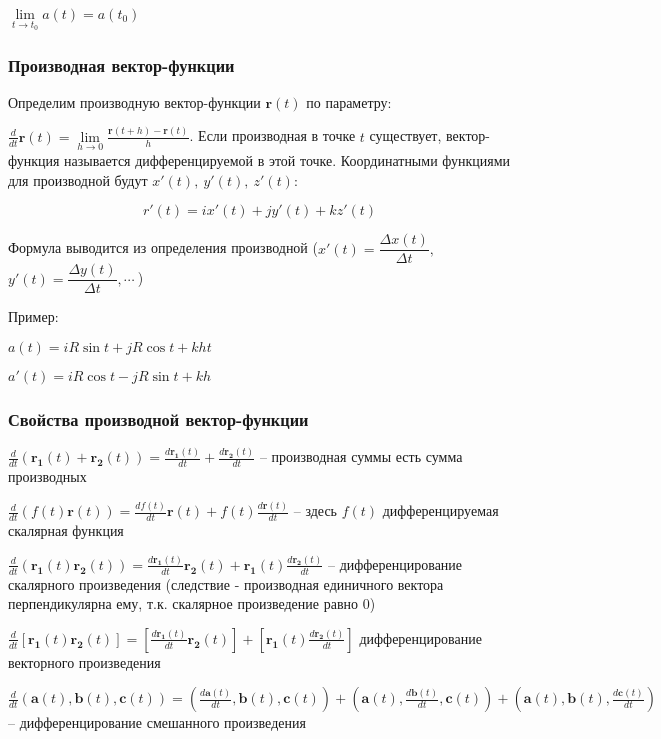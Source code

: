 $ \lim\limits_{t \to t_{0}}  a(t) = a(t_{0}) $

\subsubsection{Производная вектор-функции}

Определим производную вектор-функции $\mathbf{r}(t)$ по параметру:

$\frac{d}{dt}\mathbf{r}(t)=\lim\limits_{h\to 0}\frac{\mathbf{r}(t+h) - \mathbf{r}(t)}{h}$.
Если производная в точке $t$ существует, вектор-функция называется дифференцируемой в этой точке. Координатными функциями для производной будут $x'(t),\ y'(t),\ z'(t)$:

$$
r'(t) = i x'(t) + j y'(t) + k z'(t) \label{vector_derivative}
$$

Формула выводится из определения производной ($ x'(t) = \dfrac{\Delta x(t)}{\Delta t}, $
$y'(t) = \dfrac{\Delta y(t)}{\Delta t}, \cdots~$)

Пример:

$ a(t) = i R\sin t + j R\cos t + k h t$

$ a'(t) = i R\cos t - j R\sin t + k h $

\subsubsection{Свойства производной вектор-функции}

$ \frac{d}{dt} (\mathbf{r_1}(t)+\mathbf{r_2}(t))=\frac{d\mathbf{r_1}(t)}{dt}+ \frac{d\mathbf{r_2}(t)}{dt}$ -- производная суммы есть сумма производных

$ \frac{d}{dt} (f(t)\mathbf{r}(t))=\frac{df(t)}{dt}\mathbf{r}(t) + f(t)\frac{d\mathbf{r}(t)}{dt} $ -- здесь $ f(t)$ дифференцируемая скалярная функция

$ \frac{d}{dt} (\mathbf{r_1}(t)\mathbf{r_2}(t))=\frac{d\mathbf{r_1}(t)}{dt}\mathbf{r_2}(t) + \mathbf{r_1}(t)\frac{d\mathbf{r_2}(t)}{dt} $ -- дифференцирование скалярного произведения (следствие - производная единичного вектора перпендикулярна ему, т.к. скалярное произведение равно $ 0 $)

$ \frac{d}{dt} [\mathbf{r_1}(t)\mathbf{r_2}(t)]=\left [\frac{d\mathbf{r_1}(t)}{dt}\mathbf{r_2}(t)\right ] + \left [\mathbf{r_1}(t) \frac{d\mathbf{r_2}(t)}{dt}\right] $ дифференцирование векторного произведения

$ \frac{d}{dt} (\mathbf{a}(t),\mathbf{b}(t),\mathbf{c}(t))=\left (\frac{d\mathbf{a}(t)}{dt},\mathbf{b}(t),\mathbf{c}(t)\right) + \left (\mathbf{a}(t),\frac{d\mathbf{b}(t)}{dt},\mathbf{c}(t)\right) + \left (\mathbf{a}(t), \mathbf{b}(t), \frac{d\mathbf{c}(t)}{dt}\right) $ -- дифференцирование смешанного произведения

